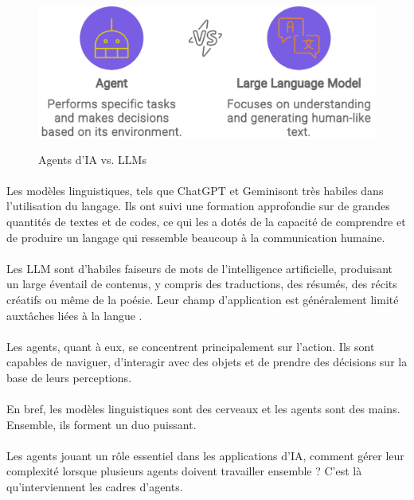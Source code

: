 \begin{figure}[h]
    \centering
    \includegraphics[width=\linewidth, height=5cm]{images/agentVsLLM.png}
    \caption{Agents d’IA vs. LLMs} 
\end{figure}

\paragraph{}
Les modèles linguistiques, tels que ChatGPT et Geminisont très habiles dans l'utilisation du langage. Ils ont suivi une formation approfondie sur de grandes quantités de textes et de codes, ce qui les a dotés de la capacité de comprendre et de produire un langage qui ressemble beaucoup à la communication humaine.

\paragraph{}
Les LLM sont d'habiles faiseurs de mots de l'intelligence artificielle, produisant un large éventail de contenus, y compris des traductions, des résumés, des récits créatifs ou même de la poésie. Leur champ d'application est généralement limité auxtâches liées à la langue .

\paragraph{}
Les agents, quant à eux, se concentrent principalement sur l'action. Ils sont capables de naviguer, d'interagir avec des objets et de prendre des décisions sur la base de leurs perceptions. 

\paragraph{}
En bref, les modèles linguistiques sont des cerveaux et les agents sont des mains. Ensemble, ils forment un duo puissant.

\paragraph{}
Les agents jouant un rôle essentiel dans les applications d'IA, comment gérer leur complexité lorsque plusieurs agents doivent travailler ensemble ? C'est là qu'interviennent les cadres d'agents.

